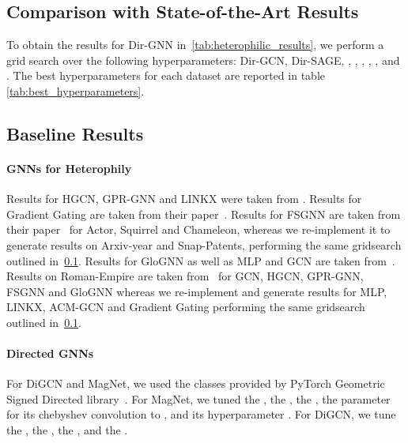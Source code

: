 \documentclass{article}
\theoremstyle{plain}
\theoremstyle{definition}
\theoremstyle{remark}
\begin{document}
\subsection{Comparison with State-of-the-Art Results} \label{sec:appendix_grid_search}

To obtain the results for Dir-GNN in~\cref{tab:heterophilic_results}, we perform a grid search over the following hyperparameters: Dir-GCN, Dir-SAGE, , , , , ,  and . The best hyperparameters for each dataset are reported in table \ref{tab:best_hyperparameters}.

\subsection{Baseline Results} \label{sec:appendix_baseline_results}
\paragraph{GNNs for Heterophily}
Results for HGCN, GPR-GNN and LINKX were taken from \citeauthor{lim2021large}. Results for Gradient Gating are taken from their paper~\cite{rusch2022gradient}. Results for FSGNN are taken from their paper~\cite{maurya2021improving} for Actor, Squirrel and Chameleon, whereas we re-implement it to generate results on Arxiv-year and Snap-Patents, performing the same gridsearch outlined in~\cref{sec:appendix_grid_search}. Results for GloGNN as well as MLP and GCN are taken from~\citeauthor{li2022finding}. Results on Roman-Empire are taken from~\citet{platonov2023a} for GCN, HGCN, GPR-GNN, FSGNN and GloGNN whereas we re-implement and generate results for MLP, LINKX, ACM-GCN and Gradient Gating performing the same gridsearch outlined in~\cref{sec:appendix_grid_search}.

\paragraph{Directed GNNs}
For DiGCN and MagNet, we used the classes provided by PyTorch Geometric Signed Directed library~\cite{he2022pytorch}. For MagNet, we tuned the , the , the , the  parameter for its chebyshev convolution to , and its  hyperparameter . For DiGCN, we tune the , the , the , and the  .
\end{document}
